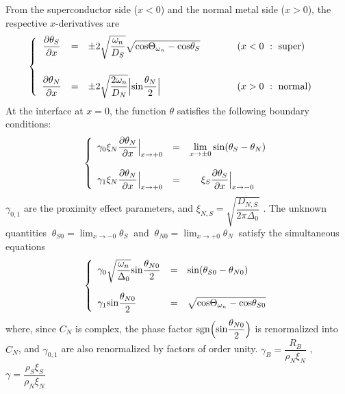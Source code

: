 \documentclass[uplatex,a4j,12pt,dvipdfmx]{jsarticle}
\begin{document}
From the superconductor side ($x<0$) and the normal metal side ($x>0$),
the respective $x$-derivatives are
\begin{eqnarray}
	\left\{
	\begin{array}{clllc}
		\dfrac{\partial \theta_{S}}{\partial x}
		 & =                         &
		\pm 2
		\sqrt{
			\dfrac{\omega_{n}}{D_{S}}
		}
		\sqrt{
		{\rm cos} \Theta_{\omega_{n}}
		-
		{\rm cos} \theta_{S}
		}
		\hspace{10mm}
		 & (x<0 \ : \ {\rm super})   &
		\\[8mm]
		\dfrac{\partial \theta_{N}}{\partial x}
		 & =                         &
		\pm
		2 \sqrt{ \dfrac{2 \omega_{n}}{D_{N}} } \Big| {\rm sin} \dfrac{\theta_{N}}{2} \Big|
		\hspace{10mm}
		 & (x>0 \ : \ {\rm normal} ) &
	\end{array}
	\right.
\end{eqnarray}
At the interface at $x=0$,
the function $\theta$ satisfies the following boundary conditions:
\begin{eqnarray}
	\left\{
	\begin{array}{clc}
		\gamma_{0} \xi_{N}
		\dfrac{\partial \theta_{N}}{\partial x}
		\Big|_{x \to +0}
		 & = &
		\displaystyle
		\lim_{x \to \pm0}
		{\rm sin}(\theta_{S} - \theta_{N})
		\\[6mm]
		\gamma_{1} \xi_{N}
		\dfrac{\partial \theta_{N}}{\partial x}
		\Big|_{x \to +0}
		 & = &
		\xi_{S}
		\dfrac{\partial \theta_{S}}{\partial x}
		\Big|_{x \to -0}
	\end{array}
	\right.
\end{eqnarray}
$\gamma_{0,1}$ are the proximity effect parameters,
and
$ \xi_{N,S} = \sqrt{\dfrac{D_{N,S}}{2 \pi \Delta_{0}}} $
.
The unknown quantities
$ \ \theta_{S0}=\displaystyle \lim_{x \to -0} \theta_{S} \ $
and
$ \ \theta_{N0}=\displaystyle \lim_{x \to +0} \theta_{N} \ $
satisfy
the simultaneous equations
\begin{eqnarray}
	\left\{
	\begin{array}{lcl}
		\gamma_{0}
		\sqrt{ \dfrac{\omega_{n}}{\Delta_{0}} } {\rm sin} \dfrac{\theta_{N0}}{2}
		 & = &
		{\rm sin}(\theta_{S0} - \theta_{N0})
		\\[6mm]
		\gamma_{1}
		{\rm sin} \dfrac{\theta_{N0}}{2}
		 & = &
		\sqrt{
		{\rm cos} \Theta_{\omega_{n}}
		-
		{\rm cos} \theta_{S0}
		}
	\end{array}
	\right.
\end{eqnarray}
where,
since $C_{N}$ is complex, the phase factor
${\rm sgn} \Big( {\rm sin} \dfrac{\theta_{N0}}{2} \Big)$
is renormalized into $C_{N}$,
and
$\gamma_{0,1}$ are also renormalized by factors of order unity.
$ \gamma_{B} = \dfrac{R_{B}}{\rho_{N} \xi_{N}} $
,
$ \gamma = \dfrac{\rho_{S} \xi_{S}}{\rho_{N} \xi_{N}} $
\end{document}
